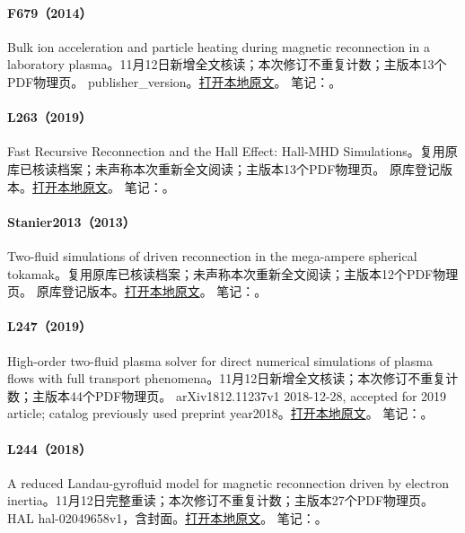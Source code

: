 \paragraph{F679（2014）}\label{paper:F679}
Bulk ion acceleration and particle heating during magnetic reconnection in a laboratory plasma。11月12日新增全文核读；本次修订不重复计数；主版本13个PDF物理页。
publisher\_version。\href{run:../../papers/F679.pdf}{打开本地原文}。
笔记：。\par\smallskip
\paragraph{L263（2019）}\label{paper:L263}
Fast Recursive Reconnection and the Hall Effect: Hall-MHD Simulations。复用原库已核读档案；未声称本次重新全文阅读；主版本13个PDF物理页。
原库登记版本。\href{run:../../papers/L263.pdf}{打开本地原文}。
笔记：。\par\smallskip
\paragraph{Stanier2013（2013）}\label{paper:Stanier2013}
Two-fluid simulations of driven reconnection in the mega-ampere spherical tokamak。复用原库已核读档案；未声称本次重新全文阅读；主版本12个PDF物理页。
原库登记版本。\href{run:../../papers/Stanier2013.pdf}{打开本地原文}。
笔记：。\par\smallskip
\paragraph{L247（2019）}\label{paper:L247}
High-order two-fluid plasma solver for direct numerical simulations of plasma flows with full transport phenomena。11月12日新增全文核读；本次修订不重复计数；主版本44个PDF物理页。
arXiv1812.11237v1 2018-12-28, accepted for 2019 article; catalog previously used preprint year2018。\href{run:../../papers/L247.pdf}{打开本地原文}。
笔记：。\par\smallskip
\paragraph{L244（2018）}\label{paper:L244}
A reduced Landau-gyrofluid model for magnetic reconnection driven by electron inertia。11月12日完整重读；本次修订不重复计数；主版本27个PDF物理页。
HAL hal-02049658v1，含封面。\href{run:../../papers/L244.pdf}{打开本地原文}。
笔记：。\par\smallskip
